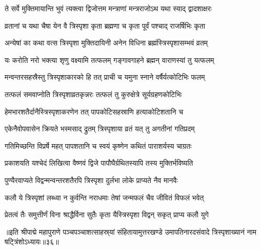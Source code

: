 \twolineshloka
{ते सर्वे मुक्तिमायान्ति भुवं त्यक्त्वा द्विजोत्तम}
{मन्त्राणां मन्त्रराजोऽथ यथा स्याद् द्वादशाक्षरः}%

\twolineshloka
{व्रतानां च यथा चैषा येन वै त्रिस्पृशा कृता}
{ब्रह्मणा च कृता पूर्वं पश्चाद् राजर्षिभिः कृता}%

\twolineshloka
{अन्येषां का कथा वत्स त्रिस्पृशा मुक्तिदायिनी}
{अनेन विधिना ब्रह्मंस्त्रिस्पृशासम्भवं व्रतम्}%

\twolineshloka
{यः करोति नरो भक्त्या शृणु वक्ष्यामि तत्फलम्}
{गङ्गावगाहने ब्रह्मन् वाराणस्यां तु यत्फलम्}%

\twolineshloka
{मन्वन्तरसहस्रैस्तु त्रिस्पृशाकारको हि तत्}
{प्राची च यमुना स्नाने वर्षैर्यत्कोटिभिः फलम्}%

\twolineshloka
{तत्फलं समवाप्नोति त्रिस्पृशाव्रतकृन्नरः}
{तत्फलं तु कुरुक्षेत्रे सूर्यग्रहणकोटिभिः}%

\twolineshloka
{हेमभारशतैर्दानैस्त्रिस्पृशाकरणेन तत्}
{पापकोटिसहस्राणि हत्याकोटिशतानि च}%

\twolineshloka
{एकेनैवोपवासेन क्रियते भस्मसाद् द्रुतम्}
{त्रिस्पृशाया व्रतं यत् तु अगतीनां गतिप्रदम्}%

\twolineshloka
{गतिमिच्छन्ति विप्रर्षे महत् पापशतानि च}
{स्वयं कृष्णेन कथितं पाराशर्यस्य चाग्रतः}%

\twolineshloka
{प्रकाशयति यश्चेदं लिखित्वा वैष्णवं द्विजे}
{पापौघैर्ग्रथितस्यापि तस्य मुक्तिर्भविष्यति}%

\twolineshloka
{पुण्यैरवाप्यते विद्वन्मन्वन्तरशतैरपि}
{त्रिस्पृशा दुर्लभा लोके प्राप्यते नैव मानवैः}%

\twolineshloka
{कलौ ये त्रिस्पृशां लब्ध्वा न कुर्वन्ति नराधमाः}
{तेषां जन्मफलं चैव जीवितं विफलं भवेत्}%

\twolineshloka
{प्रेतत्वं तैः समुत्तीर्णं विना श्राद्धैर्विना सुतैः}
{कृता यैस्त्रिस्पृशा विद्वन् सकृत् प्राप्य कलौ युगे}%

॥इति श्रीपाद्मे महापुराणे पञ्चपञ्चाशत्साहस्र्यां संहितायामुत्तरखण्डे उमापतिनारदसंवादे त्रिस्पृशाख्यानं नाम षट्त्रिंशोऽध्यायः॥३६॥

\genMangalaShloka

\hyperref[sec:ekadashi_mahatmyam_padma_puranam]{\closesub}
\clearpage

\label{sec:padma-unmilani}

\ganapatyadiDhyanam
\padmaPuranam



